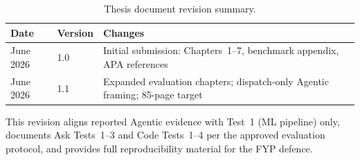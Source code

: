 \begin{table}[!ht]
\centering
\caption{Thesis document revision summary.}
\label{tab:app-revision}
\small
\begin{tabular}{|l|l|p{7.8cm}|}
\hline
\textbf{Date} & \textbf{Version} & \textbf{Changes} \\ \hline
June 2026 & 1.0 & Initial submission: Chapters~1--7, benchmark appendix, APA references \\ \hline
June 2026 & 1.1 & Expanded evaluation chapters; dispatch-only Agentic framing; 85-page target \\ \hline
\end{tabular}
\end{table}

This revision aligns reported Agentic evidence with Test~1 (ML pipeline) only, documents Ask Tests~1--3 and Code Tests~1--4 per the approved evaluation protocol, and provides full reproducibility material for the FYP defence.
